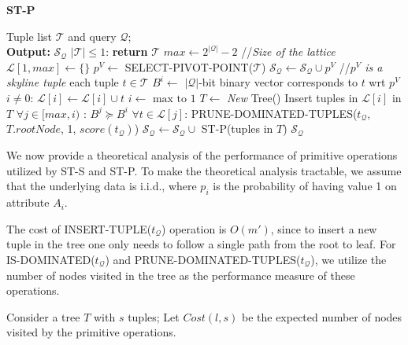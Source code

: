 \begin{algorithm}[htb]
\caption{{\bf ST-P}}
\begin{algorithmic}[1]
\label{alg:st-p}
 Tuple list $\mathcal{T}$ and query $\mathcal{Q}$; \\ {\bf Output:} $\mathcal{S}_\mathcal{Q}$
 $|\mathcal{T}| \leq 1$: {\bf return} $\mathcal{T}$
\STATE $max \leftarrow 2^{|\mathcal{Q}|} - 2$ //\textit{Size of the lattice}
\STATE $\mathcal{L}[1, max] \leftarrow \{\}$ 
\STATE $p^V \leftarrow$ SELECT-PIVOT-POINT($\mathcal{T}$)
\STATE $\mathcal{S_\mathcal{Q}} \leftarrow \mathcal{S_\mathcal{Q}} \cup p^V$ //\textit{$p^V$ is a skyline tuple}
 each tuple $t \in \mathcal{T}$
    \STATE \hindent $B^i \leftarrow$ $|\mathcal{Q}|$-bit binary vector corresponds to
    $t$ wrt $p^V$
    \STATE {} $i \neq 0$: $\mathcal{L}[i] \leftarrow \mathcal{L}[i] \cup t$
 $i \leftarrow \text{ max to } 1$
    \STATE \hindent $T \leftarrow$ {\it New} Tree()
    \STATE \hindent Insert tuples in $\mathcal{L}[i]$ in $T$
    \STATE {} $\forall j \in [max, i)$ : $B^j \succeq B^i$
        \STATE {} $\forall t \in \mathcal{L}[j]$: PRUNE-DOMINATED-TUPLES($t_{\mathcal{Q}}$, $T.rootNode$, 1, $score(t_{\mathcal{Q}})$)
    \STATE \hindent $\mathcal{S_\mathcal{Q}} \leftarrow \mathcal{S_\mathcal{Q}} \cup $ ST-P(tuples in $T$)
 $\mathcal{S_{\mathcal{Q}}}$
\end{algorithmic}
\end{algorithm}


\vspace{1mm}
 We now provide a theoretical analysis of the performance of primitive operations utilized by ST-S and ST-P. To make the theoretical analysis tractable, we assume that the
underlying data is i.i.d., where $p_i$ is the probability of having value 1 on attribute $A_i$.

The cost of INSERT-TUPLE($t_\mathcal{Q}$) operation is $O(m')$, since to insert a new tuple in the tree one only needs to follow a single path from the root to leaf. For IS-DOMINATED($t_\mathcal{Q}$) and PRUNE-DOMINATED-TUPLES($t_\mathcal{Q}$), we utilize the number of nodes visited in the tree as the performance measure of these operations.

Consider a tree $T$ with $s$ tuples;  Let $Cost(l, s)$ be the expected number of nodes visited by the primitive operations.


